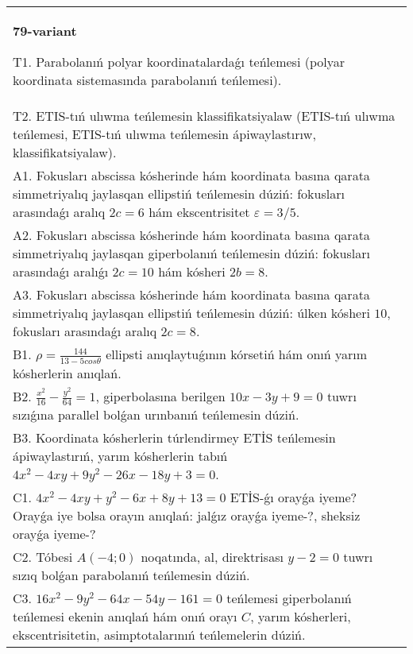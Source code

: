 \documentclass{article}
\begin{document}
\begin{tabular}{m{17cm}}
\textbf{79-variant}
\newline

T1. Parabolanıń polyar koordinatalardaǵı teńlemesi (polyar koordinata sistemasında parabolanıń teńlemesi).\\

T2. ETIS-tıń ulıwma teńlemesin klassifikatsiyalaw (ETIS-tıń ulıwma teńlemesi, ETIS-tıń ulıwma teńlemesin ápiwaylastırıw, klassifikatsiyalaw).\\

A1. Fokusları abscissa kósherinde hám koordinata basına qarata simmetriyalıq jaylasqan ellipstiń teńlemesin dúziń: fokusları arasındaǵı aralıq $2 c=6$ hám ekscentrisitet $\varepsilon=3/5$.\\

A2. Fokusları abscissa kósherinde hám koordinata basına qarata simmetriyalıq jaylasqan giperbolanıń teńlemesin dúziń: fokusları arasındaǵı aralıǵı $2 c=10$ hám kósheri $2 b=8$.\\

A3. Fokusları abscissa kósherinde hám koordinata basına qarata simmetriyalıq jaylasqan ellipstiń teńlemesin dúziń: úlken kósheri $10$, fokusları arasındaǵı aralıq $2 c=8$.\\

B1. $\rho = \frac{144}{13 - 5cos\theta}$ ellipsti anıqlaytuǵının kórsetiń hám onıń yarım kósherlerin anıqlań.\\

B2. $\frac{x^{2}}{16} - \frac{y^{2}}{64} = 1$, giperbolasına berilgen $10x - 3y + 9 = 0$ tuwrı sızıǵına parallel bolǵan urınbanıń teńlemesin dúziń.  \\

B3. Koordinata kósherlerin túrlendirmey ETİS teńlemesin ápiwaylastırıń, yarım kósherlerin tabıń $4x^{2} - 4xy + 9y^{2} - 26x - 18y + 3 = 0$.\\

C1. $4x^{2} - 4xy + y^{2} - 6x + 8y + 13 = 0$ ETİS-ǵı orayǵa iyeme? Orayǵa iye bolsa orayın anıqlań: jalǵız orayǵa iyeme-?, sheksiz orayǵa iyeme-?  \\

C2. Tóbesi $A(-4;0)$ noqatında, al, direktrisası $y - 2 = 0$ tuwrı sızıq bolǵan parabolanıń teńlemesin dúziń.\\

C3. $16x^{2} - 9y^{2} - 64x - 54y - 161 = 0$ teńlemesi giperbolanıń teńlemesi ekenin anıqlań hám onıń orayı $C$, yarım kósherleri, ekscentrisitetin, asimptotalarınıń teńlemelerin dúziń.  \\

\end{tabular}
\vspace{1cm}
\end{document}
